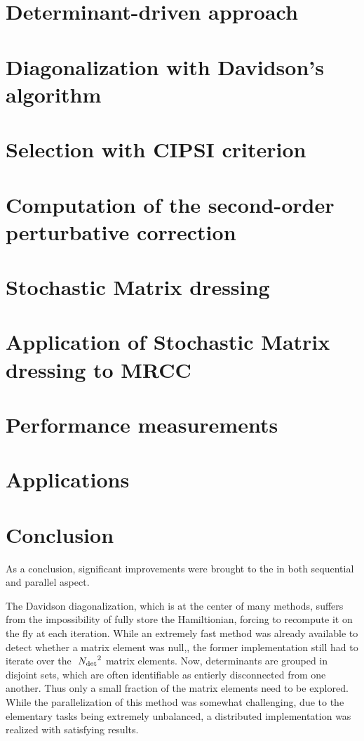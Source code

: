 \documentclass[12pt,a4paper]{report}
\begin{document}
\chapter{Determinant-driven approach}
\minitoc


\chapter{Diagonalization with Davidson's algorithm}
\minitoc


\chapter{Selection with CIPSI criterion}
\minitoc


\chapter{Computation of the second-order perturbative correction}
\minitoc


\chapter{Stochastic Matrix dressing}
\minitoc


\chapter{Application of Stochastic Matrix dressing to MRCC}
\minitoc


\chapter{Performance measurements}
\minitoc


\chapter{Applications}
\minitoc


\chapter{Conclusion}

As a conclusion, significant improvements were brought to the \QP in both sequential and parallel aspect.

The Davidson diagonalization, which is at the center of many methods, suffers from the impossibility of fully store the Hamiltionian, forcing to recompute it on the fly at each iteration. While an extremely fast method was already available to detect whether a matrix element was null,\cite{scemama_2013}, the former implementation still had to iterate over the $~{N_\text{det}}^2$ matrix elements. Now, determinants are grouped in disjoint sets, which are often identifiable as entierly disconnected from one another. Thus only a small fraction of the matrix elements need to be explored.
While the parallelization of this method was somewhat challenging, due to the elementary tasks being extremely unbalanced, a distributed implementation was realized with satisfying results.
\end{document}
